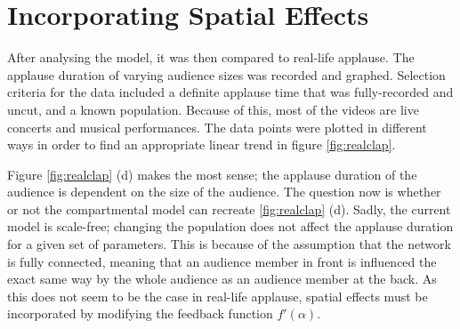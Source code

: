 \chapter{Incorporating Spatial Effects}
\label{chap4}

\hspace{\parindent} After analysing the model, it was then compared to real-life applause.
The applause duration of varying audience sizes was recorded and graphed. 
Selection criteria for the data included a definite applause time that was fully-recorded and uncut, and a known population. 
Because of this, most of the videos are live concerts and musical performances.
The data points were plotted in different ways in order to find an appropriate linear trend in figure \ref{fig:realclap}.

Figure \ref{fig:realclap} (d) makes the most sense; the applause duration of the audience is dependent on the size of the audience.
The question now is whether or not the compartmental model can recreate \ref{fig:realclap} (d).
Sadly, the current model is scale-free; changing the population does not affect the applause duration for a given set of parameters.
This is because of the assumption that the network is fully connected, meaning that an audience member in front is influenced the exact same way by the whole audience as an audience member at the back.
As this does not seem to be the case in real-life applause, spatial effects must be incorporated by modifying the feedback function $f'(\alpha)$.


